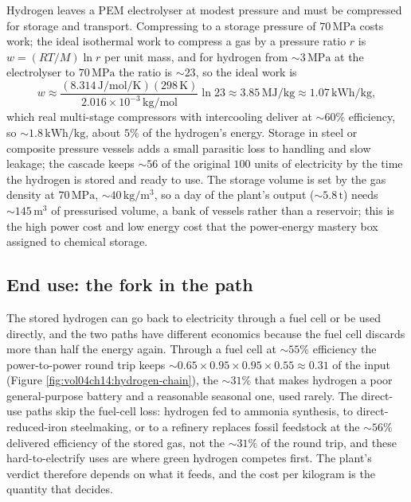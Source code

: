 Hydrogen leaves a PEM electrolyser at modest pressure and must be
compressed for storage and transport. Compressing to a storage pressure of
$70\,\si{\mega\pascal}$ costs work; the ideal isothermal work to compress a
gas by a pressure ratio $r$ is $w = (RT/M)\ln r$ per unit mass, and for
hydrogen from $\sim 3\,\si{\mega\pascal}$ at the electrolyser to $70\,\si{
\mega\pascal}$ the ratio is $\sim 23$, so the ideal work is
\[
w \approx \frac{(8.314\,\si{\joule\per\mole\per\kelvin})(298\,\si{\kelvin})}
{2.016\times 10^{-3}\,\si{\kilogram\per\mole}}\ln 23
\approx 3.85\,\si{\mega\joule\per\kilogram} \approx 1.07\,\si{\kilo\watt
\hour\per\kilogram},
\]
which real multi-stage compressors with intercooling deliver at $\sim 60\%$
efficiency, so $\sim 1.8\,\si{\kilo\watt\hour\per\kilogram}$, about $5\%$ of
the hydrogen's energy. Storage in steel or composite pressure vessels adds
a small parasitic loss to handling and slow leakage; the cascade keeps
$\sim 56$ of the original $100$ units of electricity by the time the
hydrogen is stored and ready to use. The storage volume is set by the gas
density at $70\,\si{\mega\pascal}$, $\sim 40\,\si{\kilogram\per\meter
\cubed}$, so a day of the plant's output ($\sim 5.8\,\text{t}$) needs
$\sim 145\,\si{\meter\cubed}$ of pressurised volume, a bank of vessels
rather than a reservoir; this is the high power cost and low energy cost
that the power-energy mastery box assigned to chemical storage.

\subsection{End use: the fork in the path}

The stored hydrogen can go back to electricity through a fuel cell or be
used directly, and the two paths have different economics because the fuel
cell discards more than half the energy again. Through a fuel cell at $\sim
55\%$ efficiency the power-to-power round trip keeps $\sim 0.65\times 0.95
\times 0.95\times 0.55 \approx 0.31$ of the input (Figure
\ref{fig:vol04ch14:hydrogen-chain}), the $\sim 31\%$ that makes hydrogen a
poor general-purpose battery and a reasonable seasonal one, used rarely.
The direct-use paths skip the fuel-cell loss: hydrogen fed to ammonia
synthesis, to direct-reduced-iron steelmaking, or to a refinery replaces
fossil feedstock at the $\sim 56\%$ delivered efficiency of the stored gas,
not the $\sim 31\%$ of the round trip, and these hard-to-electrify uses are
where green hydrogen competes first. The plant's verdict therefore depends
on what it feeds, and the cost per kilogram is the quantity that decides.


